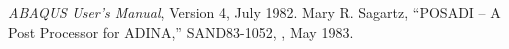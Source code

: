 \setlength{\itemsep}{\bigskipamount}
\begin{thebibliography}{99}
%
{\em ABAQUS User's Manual}, Version 4, July 1982.
%
Mary R. Sagartz, ``POSADI -- A Post Processor for ADINA,''
SAND83-1052, \SNLA, May 1983.
%

%

%

%

%
\end{thebibliography}

